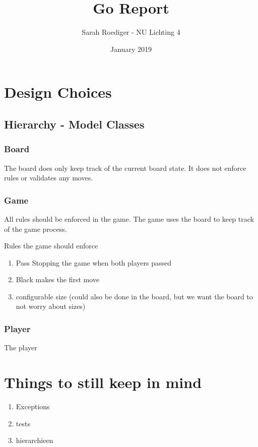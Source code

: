 \documentclass{article}
\title{Go Report}
\date{January 2019}
\begin{document}
\author{Sarah Roediger - NU Lichting 4} 
\maketitle

\section{Design Choices}

\subsection{Hierarchy - Model Classes}

\subsubsection{Board}

The board does only keep track of the current board state. It does not enforce rules or validates any moves.

\subsubsection{Game}

All rules should be enforced in the game. The game uses the board to keep track of the game process.



\n
Rules the game should enforce
\begin{enumerate} 

	\item Pass  Stopping the game when both players passed
	\item Black makes the first move
	\item configurable size (could also be done in the board, but we want the board to not worry about sizes)

\end{enumerate}

\subsubsection{Player}

The player 



\section{Things to still keep in mind}

\begin{enumerate}

	\item Exceptions 
	\item tests
	\item hierarchieen

\end{enumerate}
\end{document}
